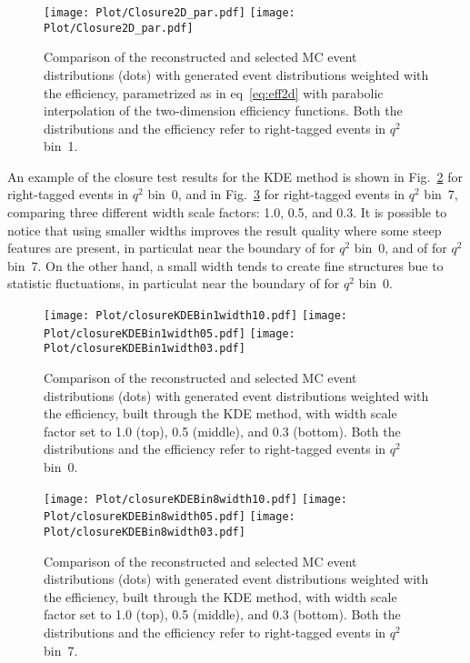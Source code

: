 \begin{figure}[hbt]
    \texttt{[image: Plot/Closure2D\_par.pdf]}
    \texttt{[image: Plot/Closure2D\_par.pdf]}
    \caption{Comparison of the reconstructed and selected MC event distributions (dots) with generated event distributions weighted with the efficiency, parametrized as in eq~\ref{eq:eff2d} with parabolic interpolation of the two-dimension efficiency functions. Both the distributions and the efficiency refer to right-tagged events in $q^2$ bin~1.}
    \label{fig:clEff2Dpar}
\end{figure}

An example of the closure test results for the KDE method is shown in Fig.~\ref{fig:clKDEwidthBin1} for right-tagged events in $q^2$ bin~0, and in Fig.~\ref{fig:clKDEwidthBin8} for right-tagged events in $q^2$ bin~7, comparing three different width scale factors: 1.0, 0.5, and 0.3.
It is possible to notice that using smaller widths improves the result quality where some steep features are present, in particulat near the boundary of \cTK for $q^2$ bin~0, and of \PHI for $q^2$ bin~7.
On the other hand, a small width tends to create fine structures bue to statistic fluctuations, in particulat near the boundary of \PHI for $q^2$ bin~0.

\begin{figure}[hbt]
    \texttt{[image: Plot/closureKDEBin1width10.pdf]}
    \texttt{[image: Plot/closureKDEBin1width05.pdf]}
    \texttt{[image: Plot/closureKDEBin1width03.pdf]}
    \caption{Comparison of the reconstructed and selected MC event distributions (dots) with generated event distributions weighted with the efficiency, built through the KDE method, with width scale factor set to 1.0 (top), 0.5 (middle), and 0.3 (bottom). Both the distributions and the efficiency refer to right-tagged events in $q^2$ bin~0.}
    \label{fig:clKDEwidthBin1}
\end{figure}

\begin{figure}[hbt]
    \texttt{[image: Plot/closureKDEBin8width10.pdf]}
    \texttt{[image: Plot/closureKDEBin8width05.pdf]}
    \texttt{[image: Plot/closureKDEBin8width03.pdf]}
    \caption{Comparison of the reconstructed and selected MC event distributions (dots) with generated event distributions weighted with the efficiency, built through the KDE method, with width scale factor set to 1.0 (top), 0.5 (middle), and 0.3 (bottom). Both the distributions and the efficiency refer to right-tagged events in $q^2$ bin~7.}
    \label{fig:clKDEwidthBin8}
\end{figure}

